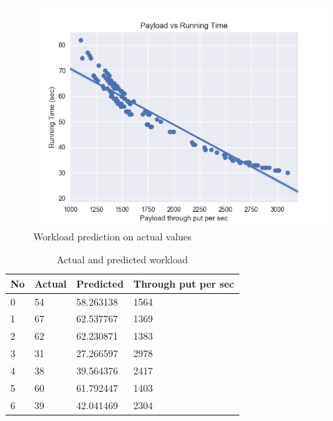 \documentclass[12pt, letterpaper, titlepage]{report}
\begin{document}
\begin{figure}[h]
	\centering
	\includegraphics{workloadPrediction100.png}
	\caption{Workload prediction on actual values}
	\label{fig_workloadPred100}
\end{figure}


\begin{table}[h!]
	\centering
	\begin{tabular}{|l|l|l|l|}
		\hline
		\textbf{No} &     \textbf{Actual} &   \textbf{Predicted} &   \textbf{Through put per sec} \\ \hline
		0   &    54 & 58.263138   &              1564 \\ \hline
		1   &   67 & 62.537767       &          1369 \\ \hline
		2   &   62 & 62.230871     &            1383 \\ \hline
		3   &    31 & 27.266597     &            2978 \\ \hline
		4   &    38 & 39.564376    &             2417 \\ \hline
		5   &    60 & 61.792447    &             1403 \\ \hline
		6   &    39 & 42.041469    &             2304 \\ \hline
	\end{tabular}
	\caption{Actual and predicted workload}
	\label{actualPred100}
\end{table}
\end{document}

